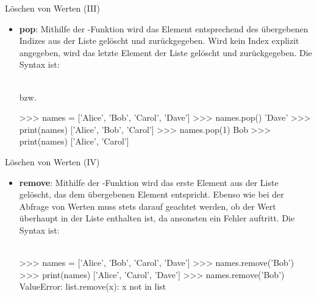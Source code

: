         
        \begin{frame}[fragile]{Löschen von Werten (III)}
            \begin{itemize}
                \item \textbf{pop}: Mithilfe der -Funktion wird das Element entsprechend des übergebenen Indizes aus der Liste gelöscht und zurückgegeben. Wird kein Index explizit angegeben, wird das letzte Element der Liste gelöscht und zurückgegeben. Die Syntax ist: \\~\
                
                 bzw. 
                
\begin{pyconcode}
>>> names = ['Alice', 'Bob', 'Carol', 'Dave']
>>> names.pop()
'Dave'
>>> print(names)
['Alice', 'Bob', 'Carol']
>>> names.pop(1)
Bob
>>> print(names)
['Alice', 'Carol']
\end{pyconcode} 

            \end{itemize}
        \end{frame}
        
        
        \begin{frame}[fragile]{Löschen von Werten (IV)}
            \begin{itemize}
                \item \textbf{remove}: Mithilfe der -Funktion wird das erste Element aus der Liste gelöscht, das dem übergebenen Element entspricht. Ebenso wie bei der Abfrage von Werten muss stets darauf geachtet werden, ob der Wert überhaupt in der Liste enthalten ist, da ansonsten ein Fehler auftritt. Die Syntax ist: \\~\
                
                
\begin{pyconcode}
>>> names = ['Alice', 'Bob', 'Carol', 'Dave']
>>> names.remove('Bob')
>>> print(names)
['Alice', 'Carol', 'Dave']
>>> names.remove('Bob')
ValueError: list.remove(x): x not in list
\end{pyconcode} 

            \end{itemize}
        \end{frame}
        
